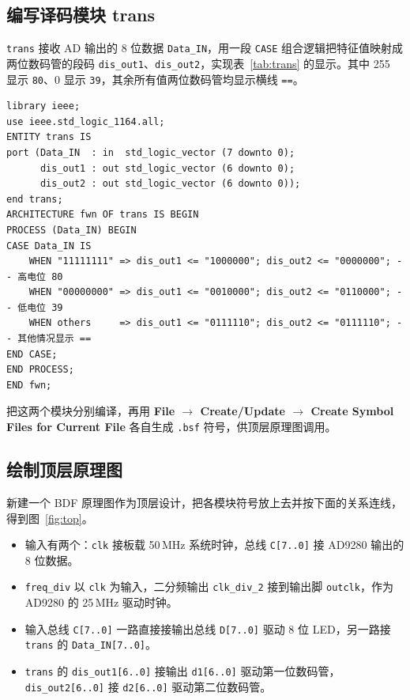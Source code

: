 \documentclass[12pt]{ctexart}
\begin{document}
\subsection{编写译码模块 trans}

\texttt{trans} 接收 AD 输出的 8 位数据 \texttt{Data\_IN}，用一段 \texttt{CASE} 组合逻辑把特征值映射成两位数码管的段码 \texttt{dis\_out1}、\texttt{dis\_out2}，实现表~\ref{tab:trans} 的显示。其中 255 显示 \texttt{80}、0 显示 \texttt{39}，其余所有值两位数码管均显示横线 \texttt{==}。

\begin{verbatim}
library ieee;
use ieee.std_logic_1164.all;
ENTITY trans IS
port (Data_IN  : in  std_logic_vector (7 downto 0);
      dis_out1 : out std_logic_vector (6 downto 0);
      dis_out2 : out std_logic_vector (6 downto 0));
end trans;
ARCHITECTURE fwn OF trans IS BEGIN
PROCESS (Data_IN) BEGIN
CASE Data_IN IS
    WHEN "11111111" => dis_out1 <= "1000000"; dis_out2 <= "0000000"; -- 高电位 80
    WHEN "00000000" => dis_out1 <= "0010000"; dis_out2 <= "0110000"; -- 低电位 39
    WHEN others     => dis_out1 <= "0111110"; dis_out2 <= "0111110"; -- 其他情况显示 ==
END CASE;
END PROCESS;
END fwn;
\end{verbatim}
\label{lst:trans}

把这两个模块分别编译，再用 \textbf{File $\rightarrow$ Create/Update $\rightarrow$ Create Symbol Files for Current File} 各自生成 \texttt{.bsf} 符号，供顶层原理图调用。

\subsection{绘制顶层原理图}

新建一个 BDF 原理图作为顶层设计，把各模块符号放上去并按下面的关系连线，得到图~\ref{fig:top}。

\begin{itemize}
    \item 输入有两个：\texttt{clk} 接板载 50\,MHz 系统时钟，总线 \texttt{C[7..0]} 接 AD9280 输出的 8 位数据。
    \item \texttt{freq\_div} 以 \texttt{clk} 为输入，二分频输出 \texttt{clk\_div\_2} 接到输出脚 \texttt{outclk}，作为 AD9280 的 25\,MHz 驱动时钟。
    \item 输入总线 \texttt{C[7..0]} 一路直接接输出总线 \texttt{D[7..0]} 驱动 8 位 LED，另一路接 \texttt{trans} 的 \texttt{Data\_IN[7..0]}。
    \item \texttt{trans} 的 \texttt{dis\_out1[6..0]} 接输出 \texttt{d1[6..0]} 驱动第一位数码管，\texttt{dis\_out2[6..0]} 接 \texttt{d2[6..0]} 驱动第二位数码管。
\end{itemize}
\end{document}
